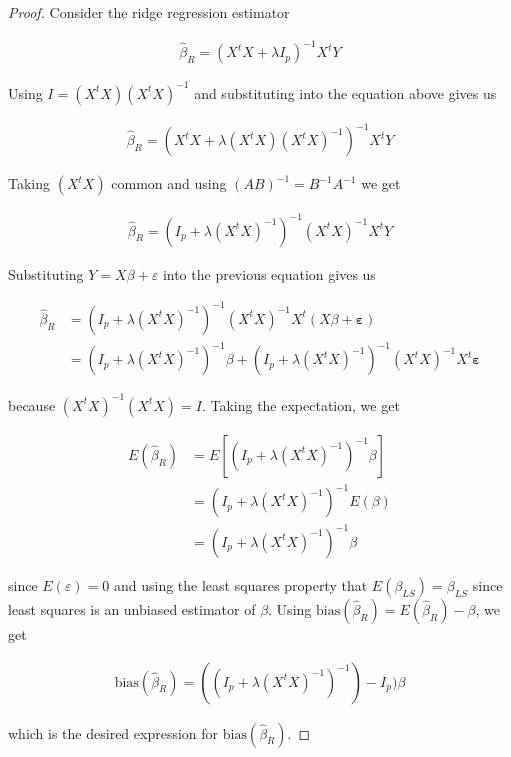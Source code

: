 \documentclass[paper=a4, fontsize=11pt]{scrartcl} %
\numberwithin{equation}{section} %
\begin{document}
\begin{proof}

Consider the ridge regression estimator

\begin{align}
\hat{\beta}_R = (X^t X + \lambda I_p)^{-1} X^t Y
\end{align}

Using $I = (X^t X)(X^t X)^{-1}$ and substituting into the equation above gives us

\begin{align}
\hat{\beta}_R = (X^t X + \lambda (X^t X)(X^t X)^{-1})^{-1} X^t Y
\end{align}

Taking $(X^t X)$ common and using $(AB)^{-1} = B^{-1}A^{-1}$ we get

\begin{align}
\hat{\beta}_R = (I_p + \lambda (X^t X)^{-1})^{-1} (X^t X)^{-1} X^t Y 
\end{align}

Substituting $Y = X \beta + \varepsilon$ into the previous equation gives us

\begin{align}
\hat{\beta}_R &= (I_p + \lambda (X^t X)^{-1})^{-1} (X^t X)^{-1} X^t (X \beta + \bm{\varepsilon} ) \\
			  &=(I_p + \lambda (X^t X)^{-1})^{-1} \beta + (I_p + \lambda (X^t X)^{-1})^{-1} (X^t X)^{-1} X^t \bm{\varepsilon}
\end{align}

because $(X^t X)^{-1} (X^t X) = I$.  Taking the expectation, we get

\begin{align}
E(\hat{\beta}_R) &= E[(I_p + \lambda (X^t X)^{-1})^{-1} \beta] \\
				 &= (I_p + \lambda (X^t X)^{-1})^{-1} E(\beta) \\
				 &= (I_p + \lambda (X^t X)^{-1})^{-1} \beta
\end{align}

since $E(\varepsilon) = 0$ and using the least squares property that $E(\beta_{LS}) = \beta_{LS}$ since least squares is an unbiased estimator of $\beta$. Using $\textrm{bias}(\hat{\beta}_R) = E(\hat{\beta}_R) - \beta$, we get

\begin{align}
\textrm{bias}(\hat{\beta}_R) = ((I_p + \lambda (X^t X)^{-1})^{-1}) - I_p) \beta
\end{align}

which is the desired expression for $\textrm{bias}(\hat{\beta}_R)$.
\end{proof}
\end{document}
